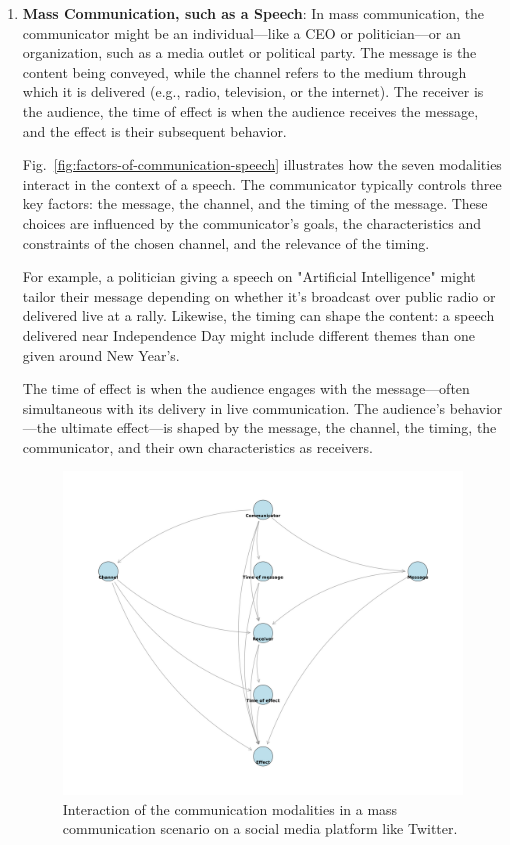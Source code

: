 \begin{enumerate}
    \item \textbf{Mass Communication, such as a Speech}: In mass communication, the communicator might be an individual—like a CEO or politician—or an organization, such as a media outlet or political party. The message is the content being conveyed, while the channel refers to the medium through which it is delivered (e.g., radio, television, or the internet). The receiver is the audience, the time of effect is when the audience receives the message, and the effect is their subsequent behavior.

    Fig.~\ref{fig:factors-of-communication-speech} illustrates how the seven modalities interact in the context of a speech. The communicator typically controls three key factors: the message, the channel, and the timing of the message. These choices are influenced by the communicator's goals, the characteristics and constraints of the chosen channel, and the relevance of the timing.

    For example, a politician giving a speech on "Artificial Intelligence" might tailor their message depending on whether it's broadcast over public radio or delivered live at a rally. Likewise, the timing can shape the content: a speech delivered near Independence Day might include different themes than one given around New Year's.

    The time of effect is when the audience engages with the message—often simultaneous with its delivery in live communication. The audience's behavior—the ultimate effect—is shaped by the message, the channel, the timing, the communicator, and their own characteristics as receivers.



\begin{figure}[!t]
    \centering
    \includegraphics[width=1.0\textwidth]{images/pgm_mass_communication_tweet.png}
    \caption{Interaction of the communication modalities in a mass communication scenario on a social media platform like Twitter. 
    \label{fig:factors-of-communication-tweet}}
  \end{figure}



\end{enumerate}

